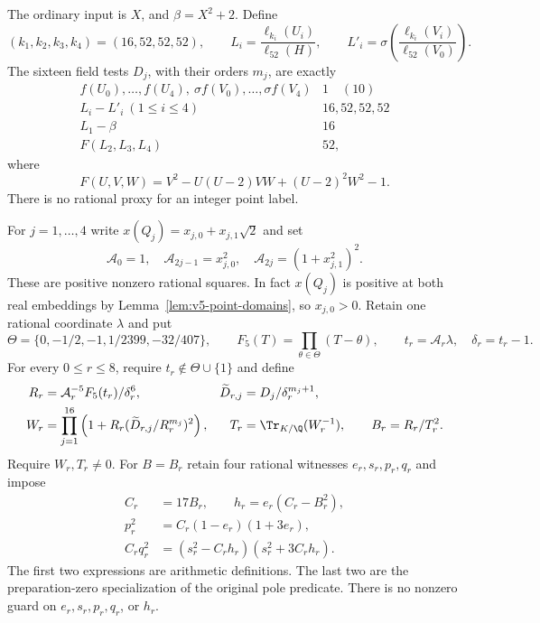 The ordinary input is $X$, and $\beta=X^2+2$. Define
\[
 (k_1,k_2,k_3,k_4)=(16,52,52,52),\qquad
 L_i=\frac{\ell_{k_i}(U_i)}{\ell_{52}(H)},\qquad
 L'_i=\sigma\!\left(\frac{\ell_{k_i}(V_i)}{\ell_{52}(V_0)}\right).
\]
The sixteen field tests $D_j$, with their orders $m_j$, are exactly
\begin{equation}\label{eq:v5-test-list}
\begin{array}{c|c}
 f(U_0),\ldots,f(U_4),\ \sigma f(V_0),\ldots,\sigma f(V_4)&1\quad(10)\\
 L_i-L'_i\ (1\le i\le4)&16,52,52,52\\
 L_1-\beta&16\\
 F(L_2,L_3,L_4)&52,
\end{array}
\end{equation}
where
\begin{equation}\label{eq:v5-lucas-polynomial}
 F(U,V,W)=V^2-U(U-2)VW+(U-2)^2W^2-1.
\end{equation}
There is no rational proxy for an integer point label.

For $j=1,\ldots,4$ write $x(Q_j)=x_{j,0}+x_{j,1}\sqrt2$ and set
\[
 \mathcal A_0=1,\quad
 \mathcal A_{2j-1}=x_{j,0}^2,\quad
 \mathcal A_{2j}=(1+x_{j,1}^2)^2.
\]
These are positive nonzero rational squares. In fact $x(Q_j)$ is
positive at both real embeddings by Lemma~\ref{lem:v5-point-domains},
so $x_{j,0}>0$. Retain one rational coordinate $\lambda$ and put
\[
 \Theta=\{0,-1/2,-1,1/2399,-32/407\},\qquad
 F_5(T)=\prod_{\theta\in\Theta}(T-\theta),\qquad
 t_r=\mathcal A_r\lambda,\quad\delta_r=t_r-1.
\]
For every $0\le r\le8$, require $t_r\notin\Theta\cup\{1\}$ and define
\begin{align}
 R_r&=\mathcal A_r^{-5}F_5(t_r)/\delta_r^6,
 &\widetilde D_{r,j}&=D_j/\delta_r^{m_j+1},\label{eq:v5-detector-data}\\
 W_r&=\prod_{j=1}^{16}
 \left(1+R_r(\widetilde D_{r,j}/R_r^{m_j})^2\right),
 &T_r&=\Tr_{K/\Q}(W_r^{-1}),\qquad B_r=R_r/T_r^2.
 \label{eq:v5-detector-product}
\end{align}
Require $W_r,T_r\ne0$. For $B=B_r$ retain four rational witnesses
$e_r,s_r,p_r,q_r$ and impose
\begin{equation}\label{eq:v5-zero-pole}
 \begin{aligned}
 C_r&=17B_r,\qquad h_r=e_r(C_r-B_r^2),\\
 p_r^2&=C_r(1-e_r)(1+3e_r),\\
 C_rq_r^2&=(s_r^2-C_rh_r)(s_r^2+3C_rh_r).
 \end{aligned}
\end{equation}
The first two expressions are arithmetic definitions. The last two
are the preparation-zero specialization of the original pole predicate.
There is no nonzero guard on $e_r,s_r,p_r,q_r$, or $h_r$.

